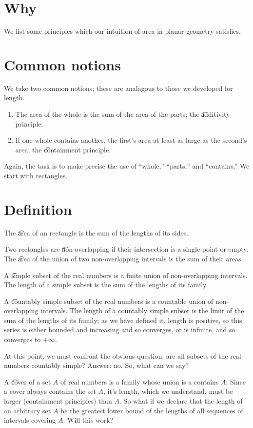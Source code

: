 
\section*{Why}

We list some principles which our intuition of area in planar geometry satisfies.

\section*{Common notions}

We take two common notions; these are analagous to those we developed for length.
  \begin{enumerate}
    \item The area of the whole is the sum of the area of the parts; the \t{additivity principle}.
    \item If one whole contains another, the first's area at least as large as the second's area; the \t{containment principle}.
  \end{enumerate}

Again, the task is to make precise the use of ``whole,'' ``parts,'' and ``contains.'' We start with rectangles.

\section*{Definition}

The \t{area} of an rectangle is the sum of the lengths of its sides.

Two rectangles are \t{non-overlapping} if their intersection is a single point or empty.
The \t{area} of the union of two non-overlapping intervals is the sum of their areas.

A \t{simple} subset of the real numbers is a finite union of non-overlapping intervals.
The length of a simple subset is the sum of the lengths of its family.

A \t{countably simple} subset of the real numbers is a countable union of non-overlapping intervals.
The length of a countably simple subset is the limit of the sum of the lengths
of its family; as we have defined it, length is positive, so this series is either bounded and increasing and so converges, or is infinite, and so converges to $+\infty$.

At this point, we must confront the obvious question: are all subsets of the real numbers countably simple?
Answer: no.
So, what can we say?

A \t{cover} of a set $A$ of real numbers is a family whose union is a contains $A$. Since a cover always contains the set $A$, it's length, which we understand, must be larger (containment principles) than $A$.
So what if we declare that the length of an arbitrary set $A$ be the greatest lower bound of the lengths of all sequences of intervals covering $A$. Will this work?

